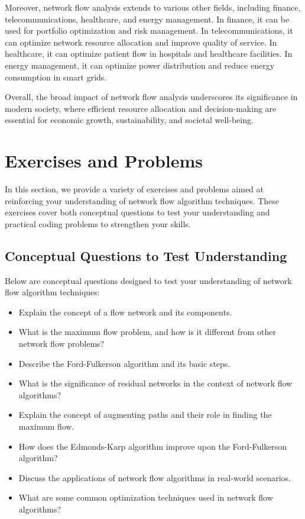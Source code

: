 \documentclass[12pt]{book} %
\begin{document}
Moreover, network flow analysis extends to various other fields, including finance, telecommunications, healthcare, and energy management. In finance, it can be used for portfolio optimization and risk management. In telecommunications, it can optimize network resource allocation and improve quality of service. In healthcare, it can optimize patient flow in hospitals and healthcare facilities. In energy management, it can optimize power distribution and reduce energy consumption in smart grids.

Overall, the broad impact of network flow analysis underscores its significance in modern society, where efficient resource allocation and decision-making are essential for economic growth, sustainability, and societal well-being.



\section{Exercises and Problems}

In this section, we provide a variety of exercises and problems aimed at reinforcing your understanding of network flow algorithm techniques. These exercises cover both conceptual questions to test your understanding and practical coding problems to strengthen your skills. 

\subsection{Conceptual Questions to Test Understanding}

Below are conceptual questions designed to test your understanding of network flow algorithm techniques:

\begin{itemize}
    \item Explain the concept of a flow network and its components.
    \item What is the maximum flow problem, and how is it different from other network flow problems?
    \item Describe the Ford-Fulkerson algorithm and its basic steps.
    \item What is the significance of residual networks in the context of network flow algorithms?
    \item Explain the concept of augmenting paths and their role in finding the maximum flow.
    \item How does the Edmonds-Karp algorithm improve upon the Ford-Fulkerson algorithm?
    \item Discuss the applications of network flow algorithms in real-world scenarios.
    \item What are some common optimization techniques used in network flow algorithms?
\end{itemize}
\end{document}
